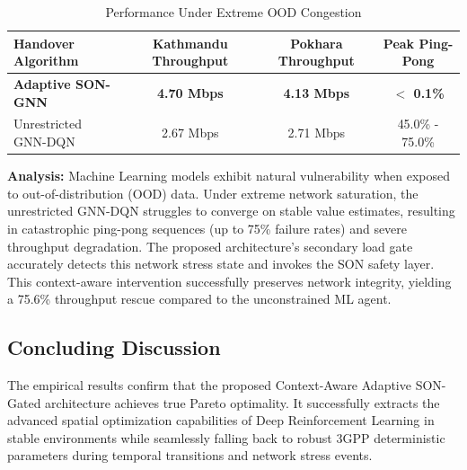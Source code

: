 \begin{table}[htbp]
\caption{Performance Under Extreme OOD Congestion}
\begin{center}
\begin{tabular}{|l|c|c|c|}
\hline
\textbf{Handover Algorithm} & \textbf{Kathmandu Throughput} & \textbf{Pokhara Throughput} & \textbf{Peak Ping-Pong} \\
\hline
\textbf{Adaptive SON-GNN} & \textbf{4.70 Mbps} & \textbf{4.13 Mbps} & \textbf{$<$ 0.1\%} \\
Unrestricted GNN-DQN & 2.67 Mbps & 2.71 Mbps & 45.0\% - 75.0\% \\
\hline
\end{tabular}
\label{tab:congestion}
\end{center}
\end{table}

\textbf{Analysis:} Machine Learning models exhibit natural vulnerability when exposed to out-of-distribution (OOD) data. Under extreme network saturation, the unrestricted GNN-DQN struggles to converge on stable value estimates, resulting in catastrophic ping-pong sequences (up to 75\% failure rates) and severe throughput degradation. The proposed architecture's secondary load gate accurately detects this network stress state and invokes the SON safety layer. This context-aware intervention successfully preserves network integrity, yielding a 75.6\% throughput rescue compared to the unconstrained ML agent.

\subsection{Concluding Discussion}
The empirical results confirm that the proposed Context-Aware Adaptive SON-Gated architecture achieves true Pareto optimality. It successfully extracts the advanced spatial optimization capabilities of Deep Reinforcement Learning in stable environments while seamlessly falling back to robust 3GPP deterministic parameters during temporal transitions and network stress events.

